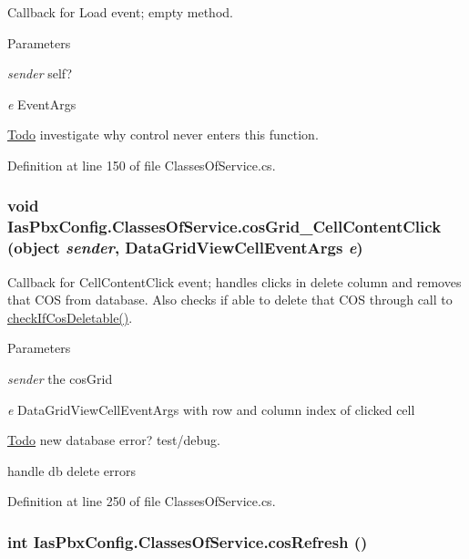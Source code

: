 Callback for Load event; empty method. 
\begin{DoxyParams}{Parameters}
\item[{\em sender}]self? \item[{\em e}]EventArgs \end{DoxyParams}
\begin{Desc}
\item[\hyperlink{todo__todo000003}{Todo}]investigate why control never enters this function. \end{Desc}


Definition at line 150 of file ClassesOfService.cs.\hypertarget{class_ias_pbx_config_1_1_classes_of_service_ad3ff80cdde49deb255892d69bb637e0e}{
\subsubsection[{cosGrid\_\-CellContentClick}]{\setlength{\rightskip}{0pt plus 5cm}void IasPbxConfig.ClassesOfService.cosGrid\_\-CellContentClick (object {\em sender}, \/  DataGridViewCellEventArgs {\em e})}}
\label{class_ias_pbx_config_1_1_classes_of_service_ad3ff80cdde49deb255892d69bb637e0e}


Callback for CellContentClick event; handles clicks in delete column and removes that COS from database. Also checks if able to delete that COS through call to \hyperlink{class_ias_pbx_config_1_1_classes_of_service_a1c71bf32df4e9f1c83dfb22383f54188}{checkIfCosDeletable()}. 
\begin{DoxyParams}{Parameters}
\item[{\em sender}]the cosGrid \item[{\em e}]DataGridViewCellEventArgs with row and column index of clicked cell \end{DoxyParams}
\begin{Desc}
\item[\hyperlink{todo__todo000006}{Todo}]new database error? test/debug. 

handle db delete errors \end{Desc}


Definition at line 250 of file ClassesOfService.cs.\hypertarget{class_ias_pbx_config_1_1_classes_of_service_ade0a8c01686723c46356a0118b50cb8a}{
\subsubsection[{cosRefresh}]{\setlength{\rightskip}{0pt plus 5cm}int IasPbxConfig.ClassesOfService.cosRefresh ()}}
\label{class_ias_pbx_config_1_1_classes_of_service_ade0a8c01686723c46356a0118b50cb8a}


